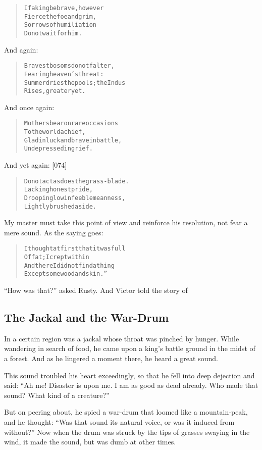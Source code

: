 \documentclass[article, twoside, 14pt]{memoir}
\renewenvironment{verbatim}{%
\begin{quote}%
\vskip -10pt%
\begin{alltt}\normalfont\large}{\end{alltt}%
\end{quote}%
\vskip -10pt
} %
\begin{document}
\begin{verbatim}
If a king be brave, however
    Fierce the foe and grim,
Sorrows of humiliation
    Do not wait for him.
\end{verbatim}
And again:

\begin{verbatim}
Bravest bosoms do not falter,
    Fearing heaven's threat:
Summer dries the pools; the Indus
    Rises, greater yet.
\end{verbatim}
And once again:

\begin{verbatim}
Mothers bear on rare occasions
    To the world a chief,
Glad in luck and brave in battle,
    Undepressed in grief.
\end{verbatim}
And yet again: [074]

\begin{verbatim}
Do not act as does the grass-blade.
    Lacking honest pride,
Drooping low in feeble meanness,
    Lightly brushed aside.
\end{verbatim}
My master must take this point of view and reinforce his
resolution, not fear a mere sound. As the saying goes:

\begin{verbatim}
I thought at first that it was full
    Of fat; I crept within
And there I did not find a thing
    Except some wood and skin.”
\end{verbatim}
``How was that?'' asked Rusty. And Victor told the story of

\subsection{The Jackal and the War-Drum}

\label{s3}

In a certain region was a jackal whose throat was pinched by
hunger. While wandering in search of food, he came upon a king's
battle ground in the midst of a forest. And as he lingered a moment
there, he heard a great sound.

This sound troubled his heart exceedingly, so that he fell into
deep dejection and said:
``Ah me! Disaster is upon me. I am as good as dead already. Who made that sound? What kind of a creature?''

But on peering about, he spied a war-drum that loomed like a
mountain-peak, and he thought:
``Was that sound its natural voice, or was it induced from without?''
Now when the drum was struck by the tips of grasses swaying in the
wind, it made the sound, but was dumb at other times.
\end{document}

